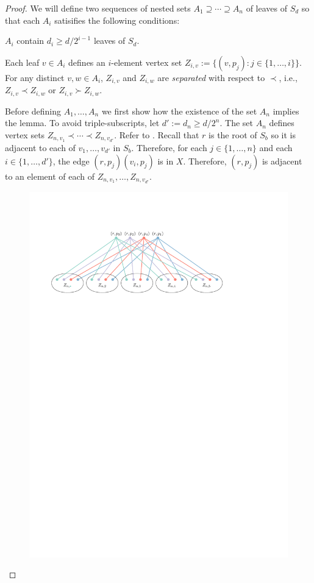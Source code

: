 \documentclass[kpfonts]{patmorin}
\renewcommand{\ge}{\geqslant}
\begin{document}
\begin{proof}
    We will define two sequences of nested sets $A_1\supseteq \cdots\supseteq A_{n}$ of leaves of $S_d$ so that each $A_i$ satisifies the following conditions:
    \begin{compactenum}[(C1)]
        \item $A_i$ contain $d_i\ge d/2^{i-1}$ leaves of $S_d$.
        \item Each leaf $v\in A_i$ defines an $i$-element vertex set $Z_{i,v}:=\{(v,p_j):j\in\{1,\ldots,i\}\}$.  For any distinct $v,w\in A_i$, $Z_{i,v}$ and $Z_{i,w}$ are \emph{separated} with respect to $\prec$, i.e., $Z_{i,v}\prec Z_{i,w}$ or $Z_{i,v}\succ Z_{i,w}$.
    \end{compactenum}

    Before defining $A_1,\ldots,A_n$ we first show how the existence of the set $A_n$ implies the lemma.  To avoid triple-subscripts, let $d':=d_n\ge d/2^n$.   The set $A_n$ defines vertex sets $Z_{n,v_1}\prec\cdots\prec Z_{n,v_{d'}}$.  Refer to . Recall that $r$ is the root of $S_b$ so it is adjacent to each of $v_{1},\ldots,v_{d'}$ in $S_b$.  Therefore, for each $j\in\{1,\ldots,n\}$ and each $i\in\{1,\ldots,d'\}$, the edge $(r,p_j)(v_i,p_j)$ is in $X$. Therefore, $(r,p_j)$ is adjacent to an element of each of $Z_{n,v_1},\ldots,Z_{n,v_{d'}}$.
	\begin{figure}
		\begin{center}
			\includegraphics{figs/twister}

\end{center}
\end{figure}
\end{proof}
\end{document}
